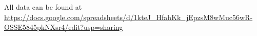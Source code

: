 All data can be found at \url{https://docs.google.com/spreadsheets/d/1kteJ_HfahKk_jEpzsM8wMuc56wR-OSSE5845pkNXsr4/edit?usp=sharing}